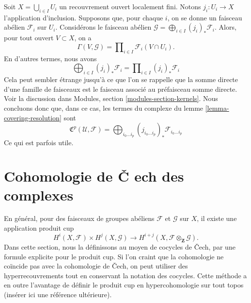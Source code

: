 \begin{remark}

\label{remark-locally-finite-sections}

Soit $X = \bigcup_{i \in I} U_i$ un recouvrement ouvert localement fini. Notons $j_i : U_i \to X$ l'application d'inclusion. Supposons que, pour chaque $i$,
on se donne un faisceau abélien $\mathcal{F}_i$ sur $U_i$. Considérons le faisceau abélien $\mathcal{G} = \bigoplus_{i \in I} (j_i)_*\mathcal{F}_i$. Alors, pour tout ouvert $V \subset X$, on a
$$
\Gamma(V, \mathcal{G}) = \prod\nolimits_{i \in I} \mathcal{F}_i(V \cap U_i).
$$
En d'autres termes, nous avons
$$
\bigoplus\nolimits_{i \in I} (j_i)_*\mathcal{F}_i =
\prod\nolimits_{i \in I} (j_i)_*\mathcal{F}_i
$$
Cela peut sembler étrange jusqu'à ce que l'on se rappelle que la somme directe d'une famille de faisceaux est le faisceau associé au préfaisceau somme directe. Voir la discussion dans Modules, section \ref{modules-section-kernels}. Nous concluons donc que, dans ce cas, les termes du complexe du lemme \ref{lemma-covering-resolution} sont
$$
{\mathfrak C}^p(\mathcal{U}, \mathcal{F}) =
\bigoplus\nolimits_{i_0 \ldots i_p}
(j_{i_0 \ldots i_p})_* \mathcal{F}_{i_0 \ldots i_p}
$$
Ce qui est parfois utile.

\end{remark}











\section{Cohomologie de {\v C}
ech des complexes}
\label{section-cech-cohomology-of-complexes}

\noindent
En général, pour des faisceaux de groupes abéliens ${\mathcal F}$ et ${\mathcal G}$ sur $X$, il existe une application produit cup $$
H^i(X, {\mathcal F}) \times H^j(X, {\mathcal G})
\longrightarrow
H^{i + j}(X, {\mathcal F} \otimes_{\mathbf Z} {\mathcal G}).
$$ Dans cette section, nous la définissons au moyen de cocycles de {\v C}ech, par une formule explicite pour le produit cup. Si l'on craint que la cohomologie ne coïncide pas avec la cohomologie de {\v C}ech, on peut utiliser des hyperrecouvrements tout en conservant la notation des cocycles. Cette méthode a en outre l'avantage de définir le produit cup en hypercohomologie sur tout topos (insérer ici une référence ultérieure).


